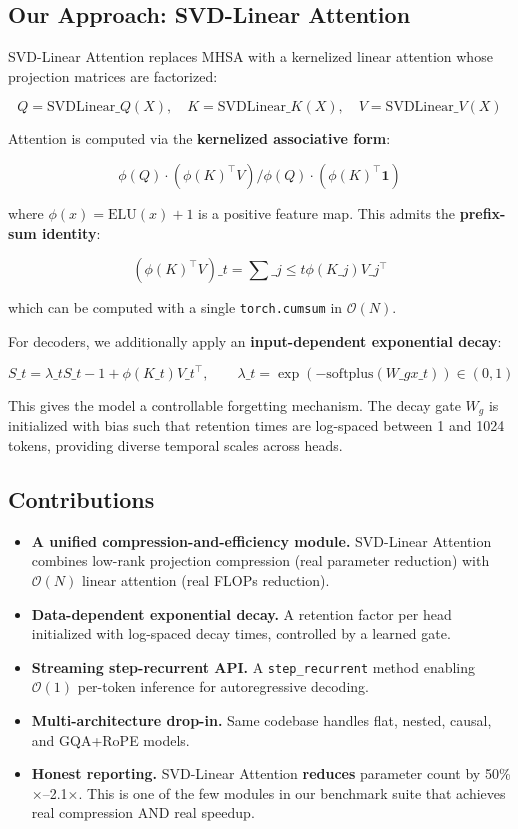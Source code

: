 \subsection{Our Approach: SVD-Linear Attention}

SVD-Linear Attention replaces MHSA with a kernelized linear attention whose 
projection matrices are factorized:

\[
Q = \text{SVDLinear}\_Q(X), \quad K = \text{SVDLinear}\_K(X), \quad V = \text{SVDLinear}\_V(X)
\tag{1.1}
\]

Attention is computed via the \textbf{kernelized associative form}:

\[
\phi(Q) \cdot (\phi(K)^\top V) \big/ \phi(Q) \cdot (\phi(K)^\top \mathbf{1})
\tag{1.2}
\]

where $\phi(x) = \text{ELU}(x) + 1$ is a positive feature map. This admits 
the \textbf{prefix-sum identity}:

\[
(\phi(K)^\top V)\_t = \sum\_{j \leq t} \phi(K\_j) V\_j^\top
\tag{1.3}
\]

which can be computed with a single \texttt{torch.cumsum} in $\mathcal{O}(N)$.

For decoders, we additionally apply an \textbf{input-dependent exponential decay}:

\[
S\_t = \lambda\_t S\_{t-1} + \phi(K\_t) V\_t^\top, \qquad
\lambda\_t = \exp(-\text{softplus}(W\_g x\_t)) \in (0, 1)
\tag{1.4}
\]

This gives the model a controllable forgetting mechanism. The decay gate 
$W_g$ is initialized with bias such that retention times are log-spaced 
between 1 and 1024 tokens, providing diverse temporal scales across heads.

\subsection{Contributions}

\begin{itemize}
\item \textbf{A unified compression-and-efficiency module.} SVD-Linear Attention
  combines low-rank projection compression (real parameter reduction) with
  $\mathcal{O}(N)$ linear attention (real FLOPs reduction).
\item \textbf{Data-dependent exponential decay.} A retention factor per head
  initialized with log-spaced decay times, controlled by a learned gate.
\item \textbf{Streaming step-recurrent API.} A \texttt{step\_recurrent} method enabling
  $\mathcal{O}(1)$ per-token inference for autoregressive decoding.
\item \textbf{Multi-architecture drop-in.} Same codebase handles flat, nested,
  causal, and GQA+RoPE models.
\item \textbf{Honest reporting.} SVD-Linear Attention \textbf{reduces} parameter count
  by 50\%$\times$--2.1$\times$. This is one of the few modules in our
  benchmark suite that achieves real compression AND real speedup.

\end{itemize}
